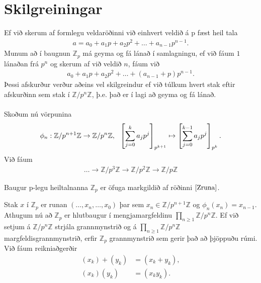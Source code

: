 \section*{Skilgreiningar}
Ef við skerum af formlegu veldaröðinni við einhvert veldið á p fæst heil tala 
\begin{align*}
a = a_0 + a_1 p + a_2 p^2 + \ldots + a_{n-1}p^{n-1}. 
\end{align*}
Munum að í baugnun $\mathbb{Z}_p$ má geyma og fá lánað í samlagningu, ef við 
fáum $1$ lánaðan frá $p^n$ og skerum af við veldið $n$, fáum við 
\begin{align*}
 a_0 + a_1 p + a_2 p^2 + \ldots + (a_{n-1} + p)p^{n-1}.
\end{align*}
Þessi afskurður verður aðeins vel skilgreindur ef við túlkum hvert 
stak eftir afskurðinn sem stak í $\mathbb{Z}/p^n \mathbb{Z}$, þ.e. það 
er í lagi að geyma og fá lánað.\\
\\Skoðum nú vörpunina
\begin{align*}
 \centering \phi_n : \mathbb{Z}/p^{n+1} \mathbb{Z} \rightarrow 
 \mathbb{Z}/p^{n} \mathbb{Z}, \ \  \left[\sum_{j=0}^k a_j p^j \right]
_{p^{k+1}} \mapsto \left[\sum_{j=0}^{k-1} a_j p^j \right]_{p^k}.
\end{align*}
Við fáum
\begin{align}\label{Zruna}
 \ldots \rightarrow \mathbb{Z}/p^{3} \mathbb{Z} \rightarrow \mathbb{Z}/p^{2} 
\mathbb{Z} \rightarrow \mathbb{Z}/p \mathbb{Z}
\end{align}
\begin{skilgr}
 Baugur p-legu heiltalnanna $\mathbb{Z}_p$ er öfuga markgildið af 
röðinni $\ref{Zruna}$.
\end{skilgr}
Stak $x$ í $\mathbb{Z}_p$ er runan $(\ldots , x_n, \ldots, x_0)$ þar sem 
$x_n \in \mathbb{Z}/p^{n+1}\mathbb{Z}$ og $\phi_n(x_{n}) = x_{n-1}$.
Athugum nú að $\mathbb{Z}_p$ er hlutbaugur í mengjamargfeldinu
 $\prod_{n \geq 1} \mathbb{Z}/p^n\mathbb{Z}$. Ef við setjum á 
$\mathbb{Z}/p^n\mathbb{Z}$ strjála grannmynstrið og á 
$\prod_{n \geq 1} \mathbb{Z}/p^n\mathbb{Z}$ 
margfeldisgrannmynstrið, erfir $\mathbb{Z}_p$ grannmynstrið sem 
gerir það að þjöppuðu rúmi.\\
Við fáum reikniaðgerðir
\begin{align*}
 (x_k) + (y_k) &= (x_k + y_k), \\
(x_k)(y_k) &= (x_k y_k).
\end{align*}
